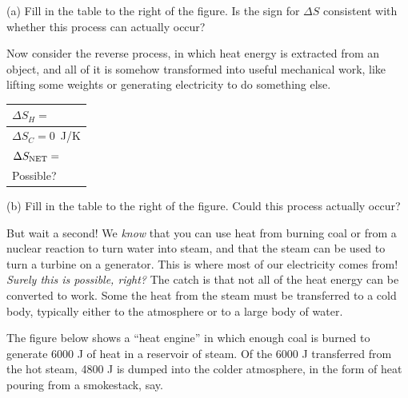 (a) Fill in the table to the right of the figure.  Is the sign for $\Delta S$ consistent with whether this process can actually occur?
\answerspace{0.6 in}

\pagebreak[3]
Now consider the reverse process, in which heat energy is extracted from an object, and all of it is somehow transformed into useful mechanical work, like lifting some weights or generating electricity to do something else.

\begin{center}
\vspace{-0.1 in}
\hspace{0.3in}
{\renewcommand{\arraystretch}{1.8}
\begin{tabular}{|L{1.6in}|} 
\hline $\Delta S_H =$ \\ 
\hline $\Delta S_C = 0$~J/K \\ 
\hline $\Delta S_{\rm NET} =$ \\ 
\hline Possible? \\ 
\hline 
\end{tabular} 
}
\vspace{-0.1 in}
\end{center}

(b) Fill in the table to the right of the figure.  Could this process actually occur? 
\answerspace{0.2 in}

But wait a second!  We \textit{know} that you can use heat from burning coal or from a nuclear reaction to turn water into steam, and that the steam can be used to turn a turbine on a generator.  This is where most of our electricity comes from!  \textit{Surely this is possible, right?}  The catch is that not all of the heat energy can be converted to work.  Some the heat from the steam must be transferred to a cold body, typically either to the atmosphere or to a large body of water.  

The figure below shows a ``heat engine'' in which enough coal is burned to generate 6000 J of heat in a reservoir of steam.  Of the 6000 J transferred from the hot steam, 4800 J is dumped into the colder atmosphere, in the form of heat pouring from a smokestack, say.   

